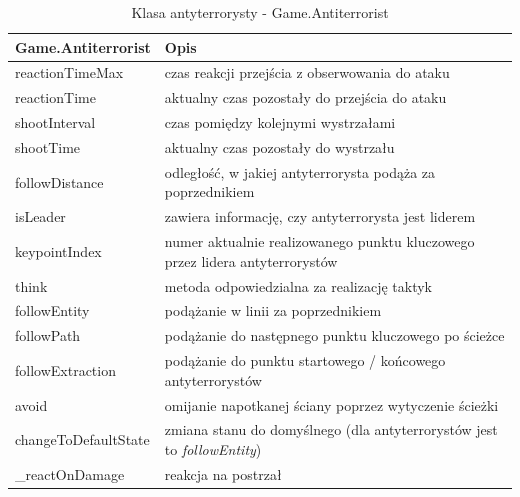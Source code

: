 \begin{table}
\begin{center}
\begin{tabular}{|p{}|p{}|}
\hline
\textbf{Game.Antiterrorist} & Opis\\\hline		
	reactionTimeMax & czas reakcji przejścia  z obserwowania do ataku\\
	reactionTime & aktualny czas pozostały do przejścia do ataku\\
	shootInterval & czas pomiędzy kolejnymi wystrzałami\\
	shootTime & aktualny czas pozostały do wystrzału\\
	followDistance & odległość, w jakiej antyterrorysta podąża za poprzednikiem\\
	isLeader & zawiera informację, czy antyterrorysta jest liderem\\
	keypointIndex & numer aktualnie realizowanego punktu kluczowego przez lidera antyterrorystów
\\\hline
	think & metoda odpowiedzialna za realizację taktyk\\
	followEntity & podążanie w linii za poprzednikiem\\ 
	followPath & podążanie do następnego punktu kluczowego po ścieżce\\
	followExtraction & podążanie do punktu startowego / końcowego antyterrorystów\\
	avoid & omijanie napotkanej ściany poprzez wytyczenie ścieżki\\
	changeToDefaultState & zmiana stanu do domyślnego (dla antyterrorystów jest to \emph{followEntity})\\
	\_reactOnDamage & reakcja na postrzał
\\\hline
\end{tabular}
\caption {Klasa antyterrorysty - Game.Antiterrorist\label{objectsGameAntiterrorist}}
\end{center}
\end{table} 


